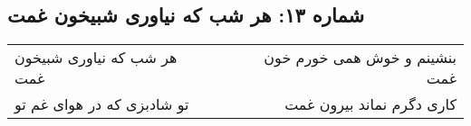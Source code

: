 \begin{center}
\section*{شماره ۱۳: هر شب که نیاوری شبیخون غمت}
\label{sec:013}
\begin{longtable}{l p{0.5cm} r}
هر شب که نیاوری شبیخون غمت
&&
بنشینم و خوش همی خورم خون غمت
\\
تو شادبزی که در هوای غم تو
&&
کاری دگرم نماند بیرون غمت
\\
\end{longtable}
\end{center}
